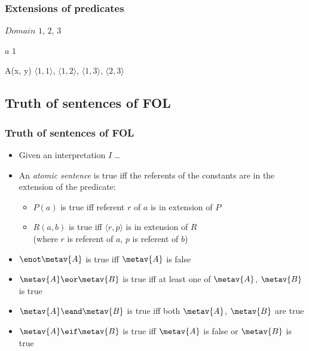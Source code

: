 \begin{frame}
\frametitle{Extensions of predicates}

\begin{ekey}
\item[$Domain$] $1$, $2$, $3$
\item[$a$] $1$
\item[A(x, y)] $\langle 1, 1\rangle$, $\langle 1,2\rangle$, $\langle 1,3\rangle$, $\langle 2,3\rangle$
\end{ekey}
\usetikzlibrary{arrows}
\hfill{}
\end{frame}

\newhourlecture
\subsection{Truth of sentences of FOL}

\begin{frame}
  \frametitle{Truth of sentences of FOL}

  \begin{itemize}[<+->]
    \item Given an interpretation $I$ \dots
    \item An \emph{atomic sentence} is true iff the referents of the constants are in the extension of the predicate:
    \begin{itemize}
    \item $P(a)$ is true iff referent $r$ of $a$ is in extension of $P$
    \item $R(a,b)$ is true iff $\langle r,p\rangle$ is in extension of $R$\\
    (where $r$ is referent of $a$, $p$ is referent of $b$)
    \end{itemize}
    \item $\enot\metav{A}$ is true iff $\metav{A}$ is false
    \item $\metav{A} \eor \metav{B}$ is true iff at least one of $\metav{A}$, $\metav{B}$ is true
    \item $\metav{A} \eand \metav{B}$ is true iff both $\metav{A}$, $\metav{B}$ are true
    \item $\metav{A} \eif \metav{B}$ is true iff $\metav{A}$ is false or $\metav{B}$ is true
  \end{itemize}
\end{frame}

